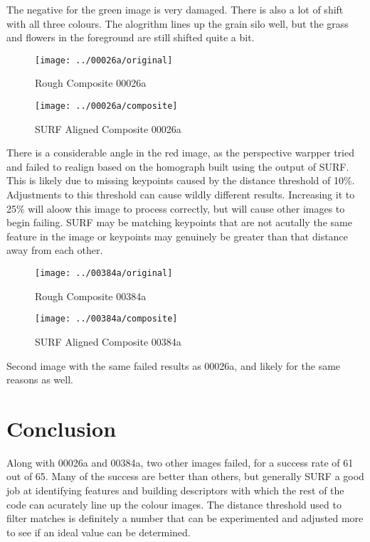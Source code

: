 \documentclass[10pt]{IEEEtran}
\begin{document}
\FloatBarrier

The negative for the green image is very damaged. There is also a lot of shift with all three colours. The alogrithm lines up the grain silo well, but the grass and flowers in the foreground are still shifted quite a bit. 


\begin{figure}[!htb]
\caption{Rough Composite 00026a}
\texttt{[image: ../00026a/original]}
\end{figure}

\begin{figure}[!htb]
\caption{SURF Aligned Composite 00026a}
\texttt{[image: ../00026a/composite]}
\end{figure}

\FloatBarrier
There is a considerable angle in the red image, as the perspective warpper tried and failed to realign based on the homograph built using the output of SURF. This is likely due to missing keypoints caused by the distance threshold of 10\%. Adjustments to this threshold can cause wildly different results. Increasing it to 25\% will aloow this image to process correctly, but will cause other images to begin failing.  SURF may be matching keypoints that are not acutally the same feature in the image or keypoints may genuinely be greater than that distance away from each other.   

\begin{figure}[!htb]
\caption{Rough Composite 00384a}
\texttt{[image: ../00384a/original]}
\end{figure}

\begin{figure}[!htb]
\caption{SURF Aligned Composite 00384a}
\texttt{[image: ../00384a/composite]}
\end{figure}

\FloatBarrier

Second image with the same failed results as 00026a, and likely for the same reasons as well.

\newpage

\section{Conclusion}

Along with 00026a and 00384a, two other images failed, for a success rate of 61 out of 65. Many of the success are better than others, but generally SURF a good job at identifying features and building descriptors with which the rest of the code can acurately line up the colour images. The distance threshold used to filter matches is definitely a number that can be experimented and adjusted more to see if an ideal value can be determined. 



		

%	
%	
\end{document}
